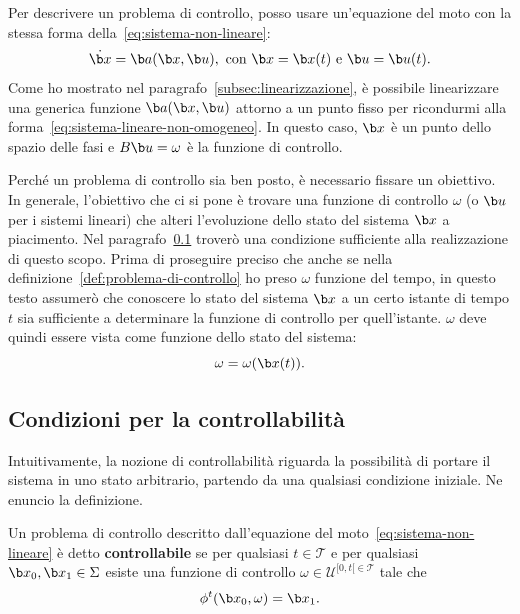 Per descrivere un problema di controllo, posso usare un'equazione del moto con la stessa forma
della~\eqref{eq:sistema-non-lineare}:
\begin{equation*}
    \dot {\b x} = \b a(\b x, \b u),\ \text{con } \b x = \b x(t)\ \text e\ \b u = \b u(t).
\end{equation*}
Come ho mostrato nel paragrafo~\ref{subsec:linearizzazione}, è possibile linearizzare
una generica funzione $\b a(\b x, \b u)$ attorno a un punto fisso per ricondurmi alla
forma~\eqref{eq:sistema-lineare-non-omogeneo}.
In questo caso, $\b x$ è un punto dello spazio delle fasi e $B\b u = \omega$ è la funzione
di controllo.

Perché un problema di controllo sia ben posto, è necessario fissare un obiettivo.
In generale, l'obiettivo che ci si pone è trovare una funzione di controllo $\omega$
(o $\b u$ per i sistemi lineari) che alteri l'evoluzione dello stato del sistema $\b x$ a piacimento.
Nel paragrafo~\ref{subsec:condizioni-controllabilità} troverò una condizione sufficiente
alla realizzazione di questo scopo.
Prima di proseguire preciso che anche se nella definizione~\ref{def:problema-di-controllo}
ho preso $\omega$ funzione del tempo,
in questo testo assumerò che conoscere lo stato del sistema $\b x$
a un certo istante di tempo $t$ sia sufficiente a determinare la funzione di controllo
per quell'istante. $\omega$ deve quindi essere vista come funzione dello stato
del sistema:
\begin{equation*}
    \omega = \omega(\b x(t)).
\end{equation*}

\subsection{Condizioni per la controllabilità}
\label{subsec:condizioni-controllabilità}
Intuitivamente, la nozione di controllabilità riguarda la possibilità di portare il sistema
in uno stato arbitrario, partendo da una qualsiasi condizione iniziale.
Ne enuncio la definizione.
\begin{definition}
    Un problema di controllo descritto dall'equazione del moto~\ref{eq:sistema-non-lineare}
    è detto \textbf{controllabile} se per qualsiasi $t \in \mathcal T$ e per qualsiasi $\b x_0, \b x_1 \in \Sigma$
    esiste una funzione di controllo $\omega \in  \mathcal U^{[0, t[ \in \mathcal T}$ tale che
    \begin{equation*}
        \phi^t(\b x_0, \omega) = \b x_1.
    \end{equation*}
    \label{def:controllabilità}
\end{definition}


